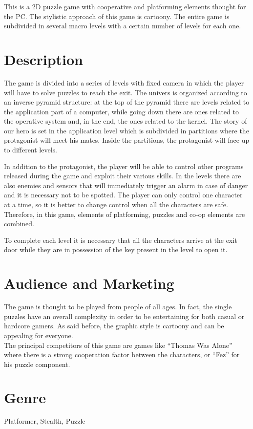 \documentclass[12pt, a4paper]{report}
\begin{document}
This is a 2D puzzle game with cooperative and platforming elements thought for the PC. The stylistic approach of this game is cartoony. The entire game is subdivided in several macro levels with a certain number of levels for each one.

\section*{Description}
The game is divided into a series of levels with fixed camera in which the player will have to solve puzzles to reach the exit. The univers is organized according to an inverse pyramid structure: at the top of the pyramid there are levels related to the application part of a computer, while going down there are ones related to the operative system and, in the end, the ones related to the kernel. The story of our hero is set in the application level which is subdivided in partitions where the protagonist will meet his mates. Inside the partitions, the protagonist will face up to different levels.

In addition to the protagonist, the player will be able to control other programs released during the game and exploit their various skills. In the levels there are also enemies and sensors that will immediately trigger an alarm in case of danger and it is necessary not to be spotted. The player can only control one character at a time, so it is better to change control when all the characters are safe. Therefore, in this game, elements of platforming, puzzles and co-op elements are combined.

To complete each level it is necessary that all the characters arrive at the exit door while they are in possession of the key present in the level to open it.

\section*{Audience and Marketing}
The game is thought to be played from people of all ages. In fact, the single puzzles have an overall complexity in order to be entertaining for both casual or hardcore gamers. As said before, the graphic style is cartoony and can be appealing for everyone.\\
The principal competitors of this game are games like “Thomas Was Alone” where there is a strong cooperation factor between the characters, or “Fez” for his puzzle component.

\section*{Genre}
Platformer, Stealth, Puzzle
\end{document}
